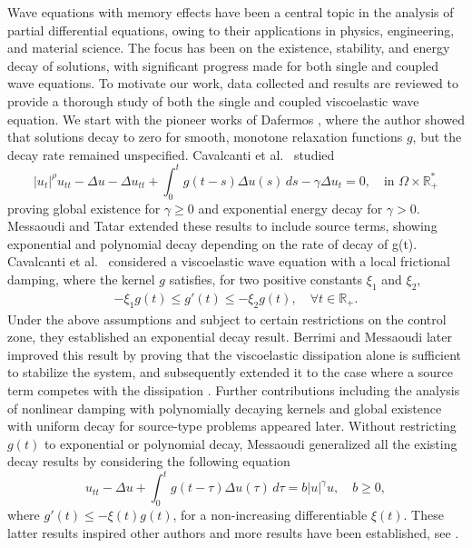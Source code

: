 \documentclass[11pt]{article}
\numberwithin{equation}{section}
\begin{document}
 Wave equations with memory effects have been a central topic in the analysis of partial
 differential equations, owing to their applications in physics, engineering, and material
 science. The focus has been on the existence, stability, and energy decay of solutions, with significant progress made for both single and coupled wave equations.
 To motivate our work, data collected and results are reviewed to provide a thorough study of
 both the single and coupled viscoelastic wave equation. We start with the pioneer works of Dafermos \cite{Dafermos1, Dafermos2}, where the author showed that solutions decay to zero
 for smooth, monotone relaxation functions $g$, but the decay rate remained unspecified. Cavalcanti et al.\ \cite{CavalcantiDS} studied
\[
|u_t|^\rho u_{tt} - \Delta u - \Delta u_{tt} + \int_0^t g(t - s) \Delta u(s) \, ds - \gamma \Delta u_t = 0,\quad \text{in } \Omega \times \mathbb{R}^{*}_{+}
\]
proving global existence for $\gamma \geq 0$ and exponential energy decay for $\gamma > 0$. Messaoudi and Tatar \cite{MTatar1, MTatar2} extended these results to include source terms, showing exponential and polynomial decay depending on the rate of decay of g(t).
Cavalcanti et al.\ \cite{CavalcantiFerreira} considered a viscoelastic wave equation with a
local frictional damping, where the kernel $g$ satisfies, for two positive constants $\xi_1$
and $\xi_2$,
\begin{align*}
-\xi_1 g(t) \leq g'(t) \leq -\xi_2 g(t), \quad \forall t \in \mathbb{R}_{+}.
\end{align*}
Under the above assumptions and subject to certain restrictions on the control zone, they established an exponential decay result. Berrimi and Messaoudi \cite{Berrimi2004} later
improved this result by proving that the viscoelastic dissipation alone is sufficient to stabilize the system, and subsequently extended it to the case where a source term competes with the dissipation \cite{Berrimi2006}.
Further contributions including the analysis of nonlinear damping with polynomially decaying kernels \cite{Cavalcanti2003} and global existence with uniform decay for source-type problems \cite{Li2011}  appeared later.
 Without restricting $g(t)$ to exponential or polynomial decay, Messaoudi \cite{SMessaoudi1, SMessaoudi2} generalized all the existing decay results by considering the following equation
\[
u_{tt} - \Delta u + \int_0^t g(t - \tau) \Delta u(\tau) \, d\tau = b |u|^{\gamma} u,\quad b \geq 0,
\]
where $g'(t) \leq -\xi(t) g(t)$, for a non-increasing differentiable $\xi(t)$.
These latter results inspired other authors and more results have been established, see \cite{SaidH2011, Hao, PJS, WSH, MessaoudiMustafa}.
\end{document}
